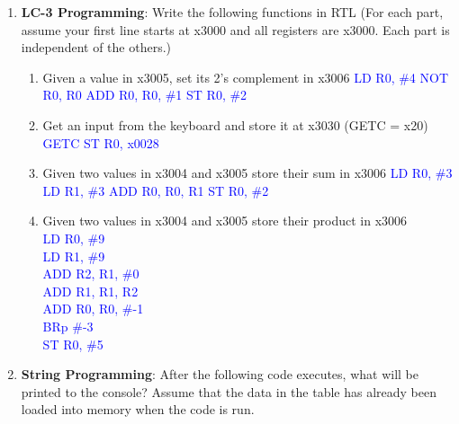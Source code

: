 \documentclass{article}
\begin{document}
\begin{enumerate}[label=(\alph*)]
\begin{enumerate}[label=(\roman*),itemsep = 10pt]
        \end{enumerate}
        \item \textbf{LC-3 Programming}: Write the following functions in RTL (For each part, assume your first line starts at x3000 and all registers are x3000. Each part is independent of the others.)
        \begin{enumerate}[label=(\roman*),itemsep = 10pt]
            \item Given a value in x3005, set its 2’s complement in x3006
            \newline \textcolor{blue}{LD R0, \#4}
            \newline \textcolor{blue}{NOT R0, R0}
            \newline \textcolor{blue}{ADD R0, R0, \#1}
            \newline \textcolor{blue}{ST R0, \#2}
            \item Get an input from the keyboard and store it at x3030 (GETC = x20)
            \newline \textcolor{blue}{GETC}
            \newline \textcolor{blue}{ST R0, x0028}
            \item Given two values in x3004 and x3005 store their sum in x3006
            \newline \textcolor{blue}{LD R0, \#3}
            \newline \textcolor{blue}{LD R1, \#3}
            \newline \textcolor{blue}{ADD R0, R0, R1}
            \newline \textcolor{blue}{ST R0, \#2}
            \item Given two values in x3004 and x3005 store their product in x3006
            \\ \textcolor{blue}{LD R0, \#9}
            \\ \textcolor{blue}{LD R1, \#9}
            \\ \textcolor{blue}{ADD R2, R1, \#0}
            \\ \textcolor{blue}{ADD R1, R1, R2}
            \\ \textcolor{blue}{ADD R0, R0, \#-1}
            \\ \textcolor{blue}{BRp \#-3}
            \\ \textcolor{blue}{ST R0, \#5}
        \end{enumerate}
        \item \textbf{String Programming}: After the following code executes, what will be printed to the console? Assume that the data in the table has already been loaded into memory when the code is run.

\end{enumerate}
\end{document}
